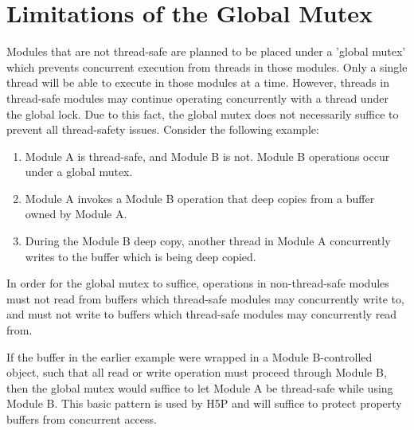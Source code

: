 \section{Limitations of the Global Mutex}

Modules that are not thread-safe are planned to be placed under a 'global mutex' which prevents concurrent execution from threads in those modules. Only a single thread will be able to execute in those modules at a time. However, threads in thread-safe modules may continue operating concurrently with a thread under the global lock. Due to this fact, the global mutex does not necessarily suffice to prevent all thread-safety issues. Consider the following example:

\begin{enumerate}
    \item Module A is thread-safe, and Module B is not. Module B operations occur under a global mutex.

    \item Module A invokes a Module B operation that deep copies from a buffer owned by Module A.

    \item During the Module B deep copy, another thread in Module A concurrently writes to the buffer which is being deep copied.
\end{enumerate}

In order for the global mutex to suffice, operations in non-thread-safe modules must not read from buffers which thread-safe modules may concurrently write to, and must not write to buffers which thread-safe modules may concurrently read from.

If the buffer in the earlier example were wrapped in a Module B-controlled object, such that all read or write operation must proceed through Module B, then the global mutex would suffice to let Module A be thread-safe while using Module B. This basic pattern is used by H5P and will suffice to protect property buffers from concurrent access.